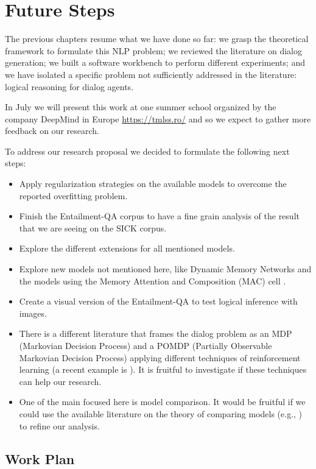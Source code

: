 \chapter{Future Steps}
\label{ch04:FutureSteps}

The previous chapters resume what we have done so far: we grasp the theoretical framework to formulate this NLP problem; we reviewed the literature on dialog generation; we built a software workbench to perform different experiments; and we have isolated a specific problem not sufficiently addressed in the literature: logical reasoning for dialog agents.

In July we will present this work at one summer school organized by the company DeepMind in Europe \url{https://tmlss.ro/} and so we expect to gather more feedback on our research.

To address our research proposal we decided to formulate the following next steps:

\begin{itemize}
\item Apply regularization strategies on the available models to overcome the reported overfitting problem. 
\item Finish the Entailment-QA corpus to have a fine grain analysis of the result that we are seeing on the SICK corpus.
\item Explore the different extensions for all mentioned models.
\item Explore new models not mentioned here, like Dynamic Memory Networks \cite{KumarISBEPOGS15} and the models using the Memory Attention and Composition (MAC) cell \cite{Manning18}.
\item Create a visual version of the Entailment-QA to test logical inference with images.
\item There is a different literature that frames the dialog problem as an MDP (Markovian Decision Process) and a POMDP (Partially Observable Markovian Decision Process) applying different techniques of reinforcement learning (a recent example is \cite{Li:2016}). It is fruitful to investigate if these techniques can help our research.
\item One of the main focused here is model comparison. It would be fruitful if we could use the available literature  on the theory of comparing models (e.g.,  \cite{BenavoliCDZ17}) to refine our analysis.
\end{itemize}


\section{Work Plan}
\label{sec:work-plan}

